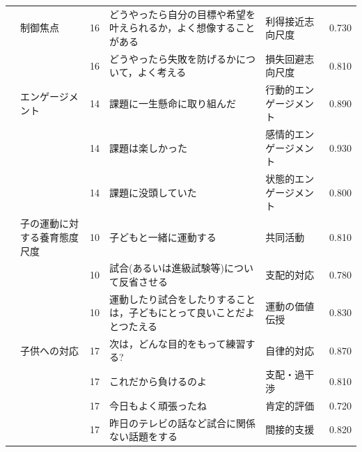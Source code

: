 \begin{landscape}
\begin{longtable}{p{2cm}p{2cm}p{2cm}p{6cm}p{2cm}p{2cm}}
		\textcite{Toyama202192}     & 制御焦点                             & 16  & どうやったら自分の目標や希望を叶えられるか，よく想像することがある                   & 利得接近志向尺度             & 0.730      \\
		                         &                                  & 16  & どうやったら失敗を防げるかについて，よく考える                             & 損失回避志向尺度             & 0.810      \\
		                         & エンゲージメント                         & 14  & 課題に一生懸命に取り組んだ                                       & 行動的エンゲージメント          & 0.890      \\
		                         &                                  & 14  & 課題は楽しかった                                            & 感情的エンゲージメント          & 0.930      \\
		                         &                                  & 14  & 課題に没頭していた                                           & 状態的エンゲージメント          & 0.800      \\
		\textcite{Togo202192}       & 子の運動に対する養育態度尺度                   & 10  & 子どもと一緒に運動する                                         & 共同活動                 & 0.810      \\
		                         &                                  & 10  & 試合(あるいは進級試験等)について反省させる                              & 支配的対応                & 0.780      \\
		                         &                                  & 10  & 運動したり試合をしたりすることは，子どもにとって良いことだよとつたえる                 & 運動の価値伝授              & 0.830      \\
		                         & 子供への対応                           & 17  & 次は，どんな目的をもって練習する?                                   & 自律的対応                & 0.870      \\
		                         &                                  & 17  & これだから負けるのよ                                          & 支配・過干渉               & 0.810      \\
		                         &                                  & 17  & 今日もよく頑張ったね                                          & 肯定的評価                & 0.720      \\
		                         &                                  & 17  & 昨日のテレビの話など試合に関係ない話題をする                              & 間接的支援                & 0.820      \\

\end{longtable}
\end{landscape}
